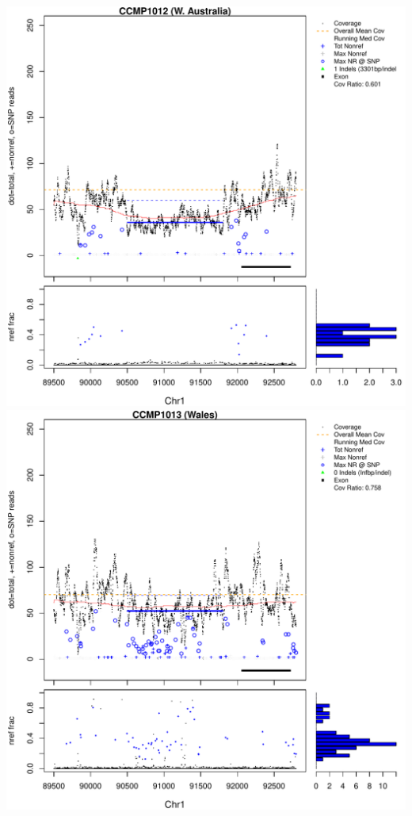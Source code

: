 \documentclass{article}\usepackage[]{graphicx}\usepackage[]{color}
\makeatletter
\def\maxwidth{ %
  \ifdim\Gin@nat@width>\linewidth
    \linewidth
  \else
    \Gin@nat@width
  \fi
}
\newenvironment{knitrout}{}{} %
\makeatother
\begin{document}
\begin{knitrout}
{\includegraphics[width=\maxwidth]{figs-knitr/unnamed-chunk-47-3} 
\includegraphics[width=\maxwidth]{figs-knitr/unnamed-chunk-47-4} 
}
\end{knitrout}
\end{document}
